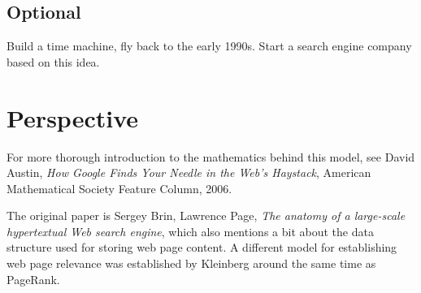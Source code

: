 \documentclass{tufte-handout}
\begin{document}
\subsection{Optional}

Build a time machine, fly back to the early 1990s.
Start a search engine company based on this idea.


\section{Perspective}

For more thorough introduction to the mathematics
  behind this model, see David Austin, \emph{How Google Finds Your Needle in
  the Web's Haystack}, American Mathematical Society Feature Column,
  2006.

The original paper is Sergey Brin, Lawrence Page, \emph{The anatomy of a
large-scale hypertextual Web search engine}, which also mentions a
bit about the data structure used for storing web page content.
A different model for establishing web page relevance was established
by Kleinberg around the same time as PageRank.
\end{document}
